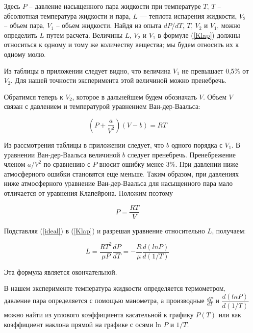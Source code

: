 \documentclass[a4paper,12pt]{article}
\begin{document}
	Здесь $P$ -- давление насыщенного пара жидкости при температуре $T$, $T$ -- абсолютная температура жидкости и пара, $L$ — теплота испарения жидкости, $V_2$ -- объем пара, $V_1$ -- объем жидкости. Найдя из опыта $dP/dT$, $T$, $V_2$ и $V_1$, можно определить $L$ путем расчета. Величины $L$, $V_2$ и $V_1$ в формуле (\ref{Klap}) должны относиться к одному и тому же количеству вещества; мы будем относить их к одному молю.
	
	Из таблицы в приложении следует видно, что величина $V_1$ не превышает 0,5\%  от $V_2$. Для нашей точности эксперимента этой величиной можно пренебречь.
	
	Обратимся теперь к $V_2$, которое в дальнейшем будем обозначать $V$. Объем $V$ связан с давлением и температурой уравнением Ван-дер-Ваальса:
	
	\begin{equation}
		\label{Van-der}
		\left( P + \frac{a}{V^2}\right)(V - b) = RT
	\end{equation}
	
	Из рассмотрения таблицы в приложении следует, что $b$ одного порядка с $V_1$. В уравнении Ван-дер-Ваальса величиной $b$ следует пренебречь. Пренебрежение членом $a/V^2$ по сравнению с $P$ вносит ошибку менее 3\%. При давлении ниже атмосферного ошибки становятся еще меньше. Таким образом, при давлениях ниже атмосферного уравнение Ван-дер-Ваальса для насыщенного пара мало отличается от уравнения Клапейрона. Положим поэтому
	
	\begin{equation}
		\label{ideal}
		P = \frac{RT}{V}
	\end{equation}

	Подставляя (\ref{ideal}) в (\ref{Klap}) и разрешая уравнение относительно $L$, получаем:
	
	\begin{equation}\label{L}
		L = \frac{RT^2}{\mu P}\frac{dP}{dT} = -\dfrac{R}{\mu} \dfrac{d(ln P)}{d(1/T)}
	\end{equation}
	
	Эта формула является окончательной.
	
	В нашем эксперименте температура жидкости определяется термометром, давление пара определяется с помощью манометра, а производные  $\frac{dP}{dT}$ и $\dfrac{d(ln P)}{d(1/T)}$ можно найти из углового коэффициента касательной к графику  $P(T)$ или как коэффициент наклона прямой на графике с осями ln $P$ и $1/T$.
	
\end{document}
